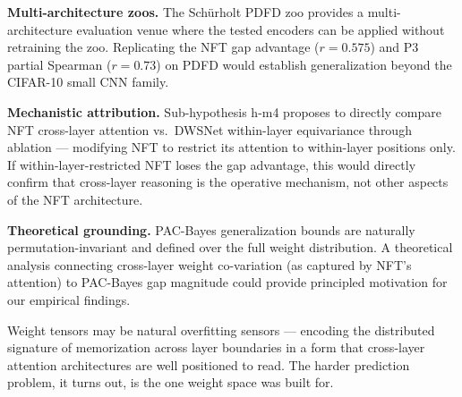 \textbf{Multi-architecture zoos.} The Sch\"{u}rholt PDFD zoo provides a multi-architecture evaluation venue
where the tested encoders can be applied without retraining the zoo. Replicating the NFT gap advantage
($r = 0.575$) and P3 partial Spearman ($r = 0.73$) on PDFD would establish generalization beyond the
CIFAR-10 small CNN family.

\textbf{Mechanistic attribution.} Sub-hypothesis h-m4 proposes to directly
compare NFT cross-layer attention vs.\ DWSNet within-layer equivariance through ablation --- modifying
NFT to restrict its attention to within-layer positions only. If within-layer-restricted NFT loses
the gap advantage, this would directly confirm that cross-layer reasoning is the operative mechanism,
not other aspects of the NFT architecture.

\textbf{Theoretical grounding.} PAC-Bayes generalization bounds are naturally permutation-invariant and
defined over the full weight distribution. A theoretical analysis connecting cross-layer weight
co-variation (as captured by NFT's attention) to PAC-Bayes gap magnitude could provide principled
motivation for our empirical findings.

Weight tensors may be natural overfitting sensors --- encoding the distributed signature of memorization
across layer boundaries in a form that cross-layer attention architectures are well positioned to read.
The harder prediction problem, it turns out, is the one weight space was built for.
